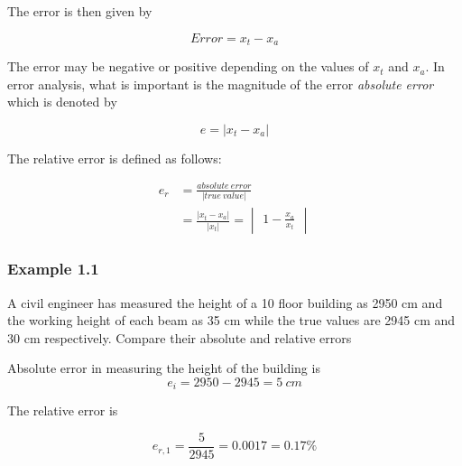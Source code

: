\documentclass[11pt, a4paper, oneside]{book}
\begin{document}
            The error is then given by

            \begin{equation*}
              Error = x_t-x_a
            \end{equation*}

            The error may be negative or positive depending on the values of $x_t$ and $x_a$. In error analysis, what is
            important is the magnitude of the error \textit{absolute error} which is denoted by

            \begin{equation*}
              e = \left | x_t-x_a \right |
            \end{equation*}

            The relative error is defined as follows:

            \begin{align*}
              e_r &= \frac{absolute\ error}{\left | true\ value \right |}\\
                  &= \frac{\left | x_t-x_a \right |}{\left | x_t \right |} = \begin{vmatrix}
                                                                               1 -\frac{x_a}{x_t}
                                                                             \end{vmatrix}
            \end{align*}

            \subsubsection{Example 1.1}
              A civil engineer has measured the height of a 10 floor building as 2950 cm and the working height of each beam
              as 35 cm while the true values are 2945 cm and 30 cm respectively. Compare their absolute and relative errors

              Absolute error in measuring the height of the building is
              \begin{equation*}
                e_i=2950-2945=5\ cm
              \end{equation*}

              The relative error is

              \begin{equation*}
                e_{r,1}=\frac{5}{2945}=0.0017=0.17\%
              \end{equation*}
\end{document}
